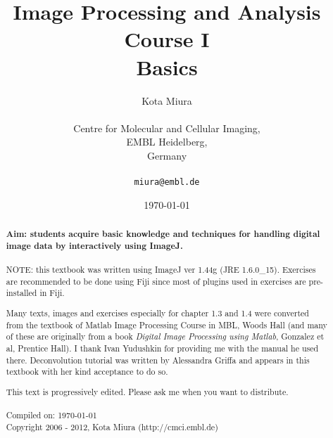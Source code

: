 \title{Image Processing and Analysis Course I\\
Basics}
\author{Kota Miura\\
\\
  Centre for Molecular and Cellular Imaging,\\
  EMBL Heidelberg,\\
  Germany\\
\\
\texttt{miura@embl.de}
}

\date{\today}

\pagestyle{empty}
\titleTH
\clearpage
\pagestyle{fancyplain}
\begin{abstract}
\HRule

\textbf{Aim: students acquire basic knowledge and techniques for handling
digital image data by interactively using ImageJ.} \\
\\

NOTE: this textbook was written using ImageJ ver 1.44g (JRE 1.6.0\_15).
Exercises are recommended to be done using Fiji since most of
plugins used in exercises are pre-installed in Fiji. 

Many texts, images
and exercises especially for chapter 1.3 and 1.4 were converted from
the textbook of Matlab Image Processing Course in MBL, Woods Hall (and many of
these are originally from a book \textit{Digital Image Processing
using Matlab}, Gonzalez et al, Prentice Hall). I
thank Ivan Yudushkin for providing me with the manual he used there. 
Deconvolution tutorial was written by Alessandra Griffa and appears in this
textbook with her kind acceptance to do so. 

This text
is progressively edited. Please ask me when you want to distribute. \\
\\
Compiled on: \today \\
Copyright 2006 - 2012, Kota Miura (http://cmci.embl.de)

\HRule
\end{abstract}